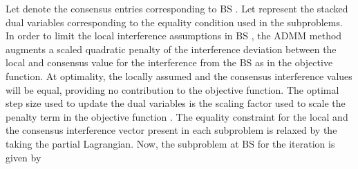 Let  denote the consensus entries corresponding to \ac{BS} . Let  represent the stacked dual variables corresponding to the equality condition  used in the subproblems. In order to limit the local interference assumptions  in \ac{BS} , the \ac{ADMM} method augments a scaled quadratic penalty of the interference deviation between the local and consensus value for the interference from the \ac{BS}  as  in the objective function. At optimality, the locally assumed and the consensus interference values will be equal,  providing no contribution to the objective function. The optimal step size used to update the dual variables is the scaling factor \me{\rho} used to scale the penalty term in the objective function \cite{boyd2011distributed,bertsekas1999nonlinear}. The equality constraint for the local and the consensus interference vector  present in each subproblem is relaxed by the taking the partial Lagrangian. Now, the subproblem at \ac{BS}  for the  iteration is given by
